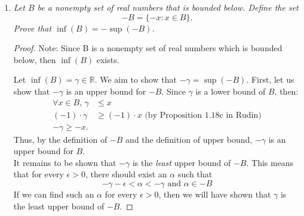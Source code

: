 \documentclass{amsart}
\begin{document}
\begin{enumerate}[1.]
\begin{proof}
\end{proof}
(b) The statement "$\gamma<\psi$ is \emph{always} true" is false.
\begin{proof}
Note: $S$ is on ordered set, so $S$ has the trichotomy property. \\
Consider, for example, $a\in S$ and $X = \{a\}$. Note that $X$ is non-empty.
Additionally, consider that $\gamma = a$ and $\psi = a$.
By definition of lower bound, $\gamma$ is a lower bound of X.
And by definition of upper bound, $\psi$ is an upper bound of X.
We can see by transitivity of equality:
\begin{align*}
    \gamma &= a = \psi \\
    \text{so } \gamma &= \psi
\end{align*}
By the trichotomy property, $ \gamma \nless \psi$.
\end{proof}

\newpage

\item \emph{Let $B$ be a nonempty set of real numbers that is bounded below. Define the set 
\[ -B = \{ -x : x \in B \}.\]
Prove that $\inf(B) = -\sup(-B)$.}
\begin{proof}
Note: Since B is a nonempty set of real numbers which is bounded below,
then $\inf(B)$ exists.

Let $\inf(B) = \gamma\in\mathbb{R}$. We aim to show that $-\gamma = \sup(-B)$.
First, let us show that $-\gamma$ is an upper bound for $-B$.
Since $\gamma$ is a lower bound of $B$, then:
\begin{align*}
    \forall x\in B \text{, } \gamma &\leq x \\
    (-1)\cdot\gamma &\geq (-1)\cdot x \text{ (by Proposition 1.18c in Rudin)} \\
    -\gamma \geq -x.
\end{align*} 
Thus, by the definition of $-B$ and the definition of upper bound,
$-\gamma$ is an upper bound for $B$. \\

It remains to be shown that $-\gamma$ is the \emph{least} upper bound of $-B$.
This means that for every $\epsilon > 0$, there should exist an $\alpha$ such that
\[
    -\gamma -\epsilon < \alpha < -\gamma \text{ and }\alpha \in -B
\]
If we can find such an $\alpha$ for every $\epsilon>0$,
then we will have shown that $\gamma$ is the least upper bound 
of $-B$.


\end{proof}
\end{enumerate}
\end{document}
